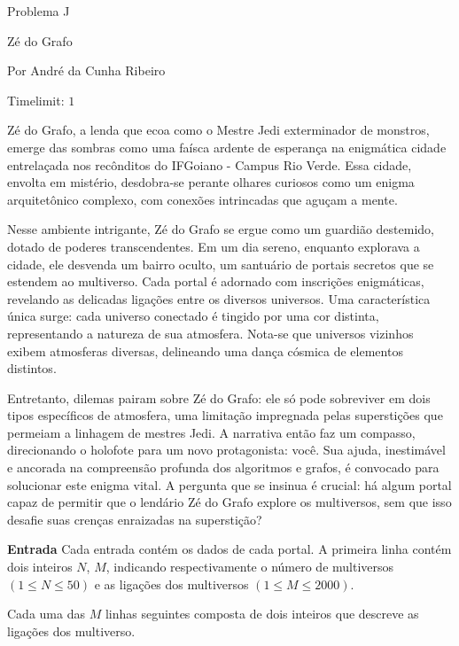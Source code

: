 \begin{center}
Problema J

Zé do Grafo

{\tiny Por André da Cunha Ribeiro}

Timelimit: $1$	
\end{center}			

{\footnotesize
Zé do Grafo, a lenda que ecoa como o Mestre Jedi exterminador de monstros, emerge das sombras como uma faísca ardente de esperança na enigmática cidade entrelaçada nos recônditos do IFGoiano - Campus Rio Verde. Essa cidade, envolta em mistério, desdobra-se perante olhares curiosos como um enigma arquitetônico complexo, com conexões intrincadas que aguçam a mente.

Nesse ambiente intrigante, Zé do Grafo se ergue como um guardião destemido, dotado de poderes transcendentes. Em um dia sereno, enquanto explorava a cidade, ele desvenda um bairro oculto, um santuário de portais secretos que se estendem ao multiverso. Cada portal é adornado com inscrições enigmáticas, revelando as delicadas ligações entre os diversos universos. Uma característica única surge: cada universo conectado é tingido por uma cor distinta, representando a natureza de sua atmosfera. Nota-se que universos vizinhos exibem atmosferas diversas, delineando uma dança cósmica de elementos distintos.

Entretanto, dilemas pairam sobre Zé do Grafo: ele só pode sobreviver em dois tipos específicos de atmosfera, uma limitação impregnada pelas superstições que permeiam a linhagem de mestres Jedi. A narrativa então faz um compasso, direcionando o holofote para um novo protagonista: você. Sua ajuda, inestimável e ancorada na compreensão profunda dos algoritmos e grafos, é convocado para solucionar este enigma vital. A pergunta que se insinua é crucial: há algum portal capaz de permitir que o lendário Zé do Grafo explore os multiversos, sem que isso desafie suas crenças enraizadas na superstição?

\vspace{0.3cm}
\textbf{Entrada}
Cada entrada contém os dados de cada portal. A primeira linha contém dois inteiros $N$, $M$, indicando respectivamente o número de multiversos $(1 \leq N \leq 50)$ e as ligações dos multiversos $(1 \leq M \leq 2000)$.

Cada uma das $M$ linhas seguintes composta de dois inteiros que descreve as ligações dos multiverso.

}

